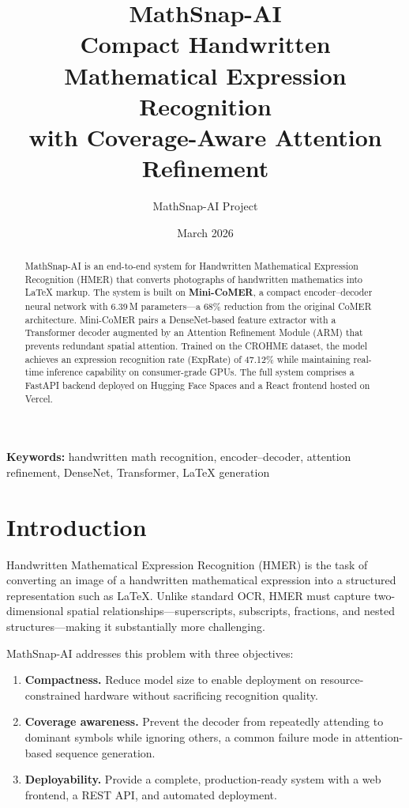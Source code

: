\documentclass[11pt,a4paper]{article}
\title{%
  \vspace{-1cm}
  \textbf{MathSnap-AI}\\[0.3em]
  \large Compact Handwritten Mathematical Expression Recognition\\
  with Coverage-Aware Attention Refinement
}
\author{MathSnap-AI Project}
\date{March 2026}
\begin{document}
\maketitle
\thispagestyle{plain}

\begin{abstract}
\noindent
MathSnap-AI is an end-to-end system for Handwritten Mathematical Expression Recognition (HMER) that converts photographs of handwritten mathematics into \LaTeX{} markup. The system is built on \textbf{Mini-CoMER}, a compact encoder--decoder neural network with 6.39\,M parameters---a 68\% reduction from the original CoMER architecture. Mini-CoMER pairs a DenseNet-based feature extractor with a Transformer decoder augmented by an Attention Refinement Module (ARM) that prevents redundant spatial attention. Trained on the CROHME dataset, the model achieves an expression recognition rate (ExpRate) of 47.12\% while maintaining real-time inference capability on consumer-grade GPUs. The full system comprises a FastAPI backend deployed on Hugging Face Spaces and a React frontend hosted on Vercel.
\end{abstract}

\vspace{0.5em}
\noindent\textbf{Keywords:} handwritten math recognition, encoder--decoder, attention refinement, DenseNet, Transformer, \LaTeX{} generation

\tableofcontents
\newpage

\section{Introduction}
\label{sec:intro}

Handwritten Mathematical Expression Recognition (HMER) is the task of converting an image of a handwritten mathematical expression into a structured representation such as \LaTeX{}. Unlike standard OCR, HMER must capture two-dimensional spatial relationships---superscripts, subscripts, fractions, and nested structures---making it substantially more challenging.

MathSnap-AI addresses this problem with three objectives:

\begin{enumerate}[nosep]
  \item \textbf{Compactness.} Reduce model size to enable deployment on resource-constrained hardware without sacrificing recognition quality.
  \item \textbf{Coverage awareness.} Prevent the decoder from repeatedly attending to dominant symbols while ignoring others, a common failure mode in attention-based sequence generation.
  \item \textbf{Deployability.} Provide a complete, production-ready system with a web frontend, a REST API, and automated deployment.
\end{enumerate}
\end{document}
